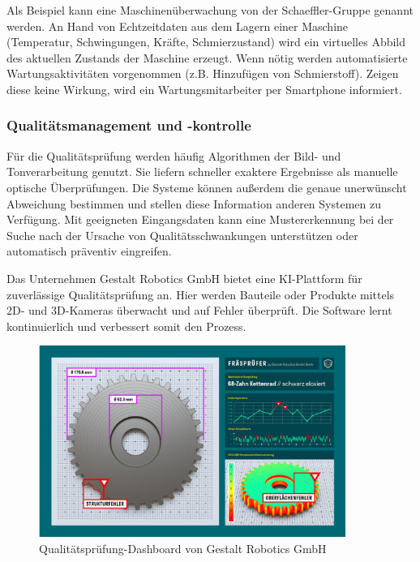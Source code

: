 \documentclass[a4paper,12pt, german]{report}
\begin{document}
Als Beispiel kann eine Maschinenüberwachung von der Schaeffler-Gruppe genannt werden. An Hand von Echtzeitdaten aus dem Lagern einer Maschine (Temperatur, Schwingungen, Kräfte, Schmierzustand) wird ein virtuelles Abbild des aktuellen Zustands der Maschine erzeugt. Wenn nötig werden automatisierte Wartungsaktivitäten vorgenommen (z.B. Hinzufügen von Schmierstoff). Zeigen diese keine Wirkung, wird ein Wartungsmitarbeiter per Smartphone informiert. \cite{30}

\subsubsection{Qualitätsmanagement und -kontrolle}
Für die Qualitätsprüfung werden häufig Algorithmen der Bild- und Tonverarbeitung genutzt. Sie liefern schneller exaktere Ergebnisse als manuelle optische Überprüfungen. Die Systeme können außerdem die genaue unerwünscht Abweichung bestimmen und stellen diese Information anderen Systemen zu Verfügung. Mit geeigneten Eingangsdaten kann eine Mustererkennung bei der Suche nach der Ursache von Qualitätsschwankungen unterstützen oder automatisch präventiv eingreifen. \cite{24}

Das Unternehmen Gestalt Robotics GmbH bietet eine KI-Plattform für zuverlässige Qualitätsprüfung an. Hier werden Bauteile oder Produkte mittels 2D- und 3D-Kameras überwacht und auf Fehler überprüft. Die Software lernt kontinuierlich und verbessert somit den Prozess. \cite{31}

\begin{figure}[H]
  \center
 \includegraphics[width=10cm]{images/Gestalt Robotics.png}
  \caption[Qualitätsprüfung-Dashboard von Gestalt Robotics GmbH]{Qualitätsprüfung-Dashboard von Gestalt Robotics GmbH \cite{31}}
\end{figure}
\end{document}
